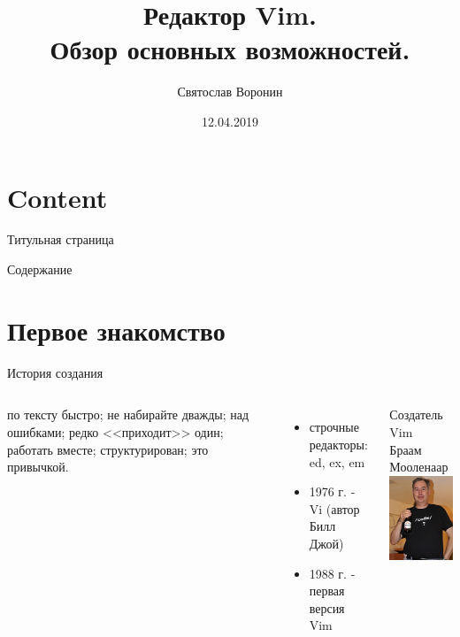\documentclass{beamer}
\title{Редактор Vim.\\Обзор основных возможностей.}
\author[С.\,П.\,Воронин]{Святослав Воронин}
\date{12.04.2019}
\institute{4 отделение 6 отдел УЭССС}
\begin{document}
\section{Content}
\begin{frame}{Титульная страница}	%
\maketitle
\end{frame}

\begin{frame}{Содержание}
\tableofcontents
\end{frame}

\section{Первое знакомство}

\begin{frame}{История создания}
	\begin{columns}[c]
			\begin{enumerate}
				 по тексту быстро;
				 не набирайте дважды;
				 над ошибками;
				 редко <<приходит>> один;
				 работать вместе;
				 структурирован;
				 это привычкой.
			\end{enumerate}
			\begin{itemize}
				\item{строчные редакторы: ed, ex, em}
				\item{1976 г. - Vi (автор Билл Джой)}
				\item{1988 г. - первая версия Vim}
			\end{itemize}
			Создатель Vim\\
			Браам Мооленаар\\
			\includegraphics{Bram_Moolenaar_in_2007.jpg}
	\end{columns}	
\end{frame}
\end{document}
